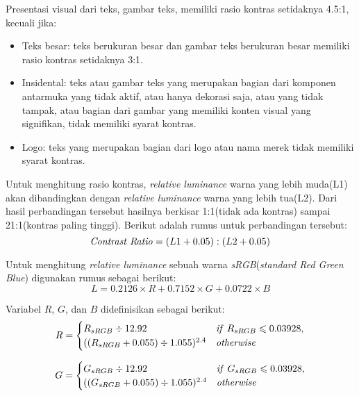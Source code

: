 Presentasi visual dari teks, gambar teks, memiliki rasio kontras setidaknya 4.5:1, kecuali jika:

\begin{itemize}
	\item Teks besar: teks berukuran besar dan gambar teks berukuran besar memiliki rasio kontras setidaknya 3:1.
	\item Insidental: teks atau gambar teks yang merupakan bagian dari komponen antarmuka yang tidak aktif, atau hanya dekorasi saja, atau yang tidak tampak, atau bagian dari gambar yang memiliki konten visual yang signifikan, tidak memiliki syarat kontras.
	\item Logo: teks yang merupakan bagian dari logo atau nama merek tidak memiliki syarat kontras.
\end{itemize}


Untuk menghitung rasio kontras, \textit{relative luminance} warna yang lebih muda(L1) akan dibandingkan dengan \textit{relative luminance} warna yang lebih tua(L2). Dari hasil perbandingan tersebut hasilnya berkisar 1:1(tidak ada kontras) sampai 21:1(kontras paling tinggi). Berikut adalah rumus untuk perbandingan tersebut:
\begin{equation}
\text{\textit{Contrast Ratio}} = (L1 + 0.05) : (L2 +0.05)
\end{equation}

Untuk menghitung \textit{relative luminance} sebuah warna \textit{sRGB}(\textit{standard Red Green Blue}) digunakan rumus sebagai berikut:
\begin{equation}
L = 0.2126 \times R + 0.7152 \times G + 0.0722 \times B
\end{equation}

Variabel $R$, $G$, dan $B$ didefinisikan sebagai berikut:
\begin{equation}
R = \begin{cases}
R_{sRGB}\div 12.92 & \text{\textit{if} $R_{sRGB} \leqslant 0.03928$}, \\
((R_{sRGB} + 0.055)\div 1.055)^{2.4} & \text{\textit{otherwise}}
\end{cases}
\end{equation}

\begin{equation}
G = \begin{cases}
G_{sRGB}\div 12.92 & \text{\textit{if} $G_{sRGB} \leqslant 0.03928$}, \\
((G_{sRGB} + 0.055)\div 1.055)^{2.4} & \text{\textit{otherwise}}
\end{cases}
\end{equation}

